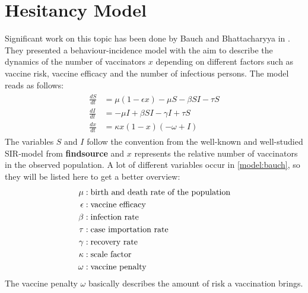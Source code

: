 \documentclass[12pt,a4paper,twoside]{article}
\begin{document}
\section{Hesitancy Model}
Significant work on this topic has been done by Bauch and Bhattacharyya in \cite{Bauch2012}. They presented a behaviour-incidence model with the aim to describe the dynamics of the number of vaccinators $x$ depending on different factors such as vaccine risk, vaccine efficacy and the number of infectious persons. The model reads as follows:
\begin{align}\label{model:bauch}
	\begin{split}
	\frac{dS}{dt} &= \mu\left(1-\epsilon x\right) - \mu S - \beta SI - \tau S\\
	\frac{dI}{dt} &= -\mu I + \beta SI - \gamma I + \tau S\\
	\frac{dx}{dt} &= \kappa x\left(1 - x\right)\left(-\omega + I\right)
	\end{split}
\end{align}
The variables $S$ and $I$ follow the convention from the well-known and well-studied \ac{SIR}-model from \textbf{findsource} %
and $x$ represents the relative number of vaccinators in the observed population. A lot of different variables occur in \eqref{model:bauch}, so they will be listed here to get a better overview:
\begin{align}\label{table:bauch_model_variables}
	\begin{split}
	\mu &: \textnormal{birth and death rate of the population}\\
	\epsilon &: \textnormal{vaccine efficacy}\\
	\beta &: \textnormal{infection rate}\\
	\tau &: \textnormal{case importation rate}\\
	\gamma &: \textnormal{recovery rate}\\
	\kappa &: \textnormal{scale factor}\\
	\omega &: \textnormal{vaccine penalty}
	\end{split}
\end{align}
The vaccine penalty $\omega$ basically describes the amount of risk a vaccination brings.
\end{document}
